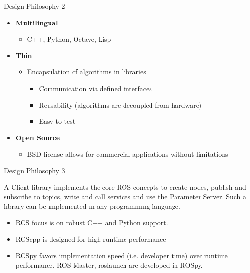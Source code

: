 \documentclass{beamer}
\begin{document}
\begin{frame}{Design Philosophy 2}
 \begin{itemize}
  \item \textbf{Multilingual}
  \begin{itemize}
   \item C++, Python, Octave, Lisp
  \end{itemize}
 \end{itemize}
 \begin{itemize}
  \item \textbf{Thin}
  \begin{itemize}
   \item Encapsulation of algorithms in libraries
   \begin{itemize}
    \item Communication via defined interfaces
    \item Reusability (algorithms are decoupled from hardware)
    \item Easy to test
   \end{itemize}
  \end{itemize}
 \end{itemize}
 \begin{itemize}
  \item \textbf{Open Source}
  \begin{itemize}
   \item BSD license allows for commercial applications without limitations
  \end{itemize}
 \end{itemize}
\end{frame}

\begin{frame}{Design Philosophy 3}
	
	\begin{definition}
		A Client library implements the core ROS concepts to create nodes, publish and subscribe to topics, write and call services and use the Parameter Server. Such a library can be implemented in any programming language.
	\end{definition}
	
	\begin{itemize}
		\item ROS focus is on robust C++ and Python support. 
		\item ROScpp is designed for high runtime performance
		\item ROSpy favors implementation speed (i.e. developer time) over runtime performance. ROS Master, roslaunch are developed in ROSpy. 
	\end{itemize}
	
\end{frame}
\end{document}
